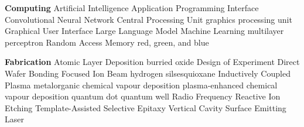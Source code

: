 
\begin{acronym}[ABCDEFGH]
	\setlength\itemsep{.0em}
	\item \textbf{Computing}
	 {Artificial Intelligence}
	 {Application Programming Interface}
	 {Convolutional Neural Network}
	 {Central Processing Unit}
	 {graphics processing unit}
	 {Graphical User Interface}
	 {Large Language Model}
	 {Machine Learning}
	 {multilayer perceptron}
	 {Random Access Memory}
	 {red, green, and blue}
	\vspace{1em}

	\item \textbf{Fabrication}
	 {Atomic Layer Deposition}
	 {burried oxide}
	 {Design of Experiment}
	 {Direct Wafer Bonding}
	 {Focused Ion Beam}
	 {hydrogen silsesquioxane}
	 {Inductively Coupled Plasma}
	 {metalorganic chemical vapour deposition}
	 {plasma-enhanced chemical vapour deposition}
	 {quantum dot}
	 {quantum well}
	  {Radio Frequency}
	 {Reactive Ion Etching}
	 {Template-Assisted Selective Epitaxy}
	 {Vertical Cavity Surface Emitting Laser}
	\vspace{1em}

\end{acronym}